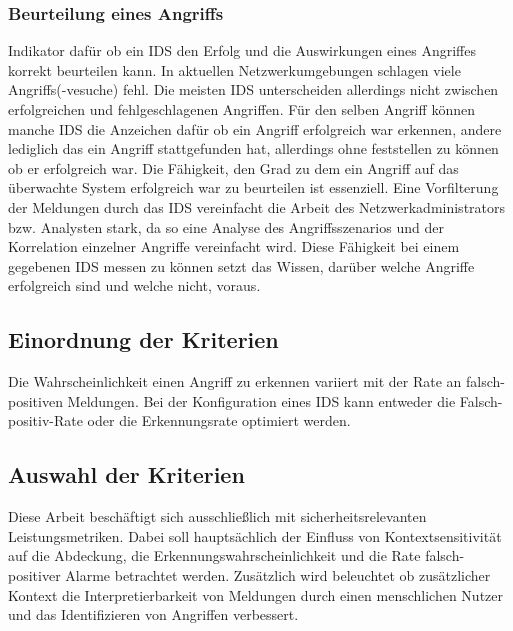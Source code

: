 \subsubsection{Beurteilung  eines Angriffs}
Indikator dafür ob ein IDS den Erfolg und die Auswirkungen eines Angriffes korrekt beurteilen kann. In aktuellen Netzwerkumgebungen schlagen viele Angriffs(-vesuche) fehl. Die meisten IDS unterscheiden allerdings nicht zwischen erfolgreichen und fehlgeschlagenen Angriffen. Für den selben Angriff können manche IDS die Anzeichen dafür ob ein Angriff erfolgreich war erkennen, andere lediglich das ein Angriff stattgefunden hat, allerdings ohne feststellen zu können ob er erfolgreich war. Die Fähigkeit, den Grad zu dem ein Angriff auf das überwachte System erfolgreich war zu beurteilen ist essenziell. Eine Vorfilterung der Meldungen durch das IDS vereinfacht die Arbeit des Netzwerkadministrators bzw. Analysten stark, da so eine Analyse des Angriffsszenarios und der Korrelation einzelner Angriffe vereinfacht wird. Diese Fähigkeit bei einem gegebenen IDS messen zu können setzt das Wissen, darüber welche Angriffe erfolgreich sind und welche nicht, voraus.


\subsection{Einordnung der Kriterien}
Die Wahrscheinlichkeit einen Angriff zu erkennen variiert mit der Rate an falsch-positiven Meldungen. Bei der Konfiguration eines IDS kann entweder die Falsch-positiv-Rate oder die Erkennungsrate optimiert werden.

\subsection{Auswahl der Kriterien}
Diese Arbeit beschäftigt sich ausschließlich mit sicherheitsrelevanten Leistungsmetriken. Dabei soll hauptsächlich der Einfluss von Kontextsensitivität auf die Abdeckung, die Erkennungswahrscheinlichkeit und die Rate falsch-positiver Alarme  betrachtet werden. Zusätzlich wird beleuchtet ob zusätzlicher Kontext die Interpretierbarkeit von Meldungen durch einen menschlichen Nutzer und das Identifizieren von Angriffen verbessert.
